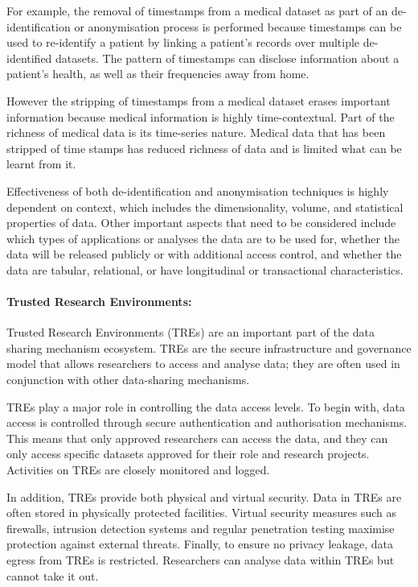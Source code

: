 \documentclass[11pt]{article}
\begin{document}
For example, the removal of timestamps from a medical dataset as part of an de-identification or anonymisation process is performed because timestamps can be used to re-identify a patient by linking a patient's records over multiple de-identified datasets. The pattern of timestamps can disclose information about a patient's health, as well as their frequencies away from home.

However the stripping of timestamps from a medical dataset erases important information because medical information is highly time-contextual. Part of the richness of medical data is its time-series nature. Medical data that has been stripped of time stamps has reduced richness of data and is limited what can be learnt from it. 

Effectiveness of both de-identification and anonymisation techniques is highly dependent on context, which includes the dimensionality, volume, and statistical properties of data. Other important aspects that need to be considered include which types of applications or analyses the data are to be used for, whether the data will be released publicly or with additional access control, and whether the data are tabular, relational, or have longitudinal or transactional characteristics.

\paragraph{Trusted Research Environments:}

Trusted Research Environments (TREs) are an important part of the data sharing mechanism ecosystem. TREs are the secure infrastructure and governance model that allows researchers to access and analyse data; they are often used in conjunction with other data-sharing mechanisms.

TREs play a major role in controlling the data access levels. To begin with, data access is controlled through secure authentication and authorisation mechanisms. This means that only approved researchers can access the data, and they can only access specific datasets approved for their role and research projects. Activities on TREs are closely monitored and logged.

In addition, TREs provide both physical and virtual security. Data in TREs are often stored in physically protected facilities. Virtual security measures such as firewalls, intrusion detection systems and regular penetration testing maximise protection against external threats.  Finally, to ensure no privacy leakage, data egress from TREs is restricted. Researchers can analyse data within TREs but cannot take it out.
\end{document}
